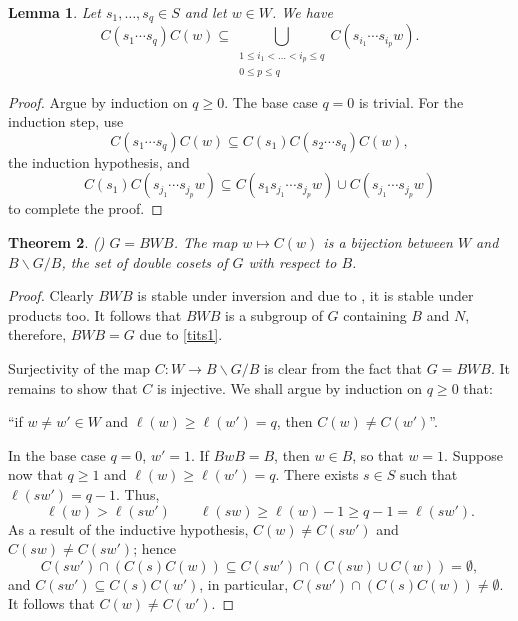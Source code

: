 \documentclass{article}
\theoremstyle{thmstyle}
\newtheorem{theorem}{Theorem}[section]
\newtheorem{lemma}[theorem]{Lemma}
\theoremstyle{defstyle}
\renewcommand{\le}{\leqslant}
\renewcommand{\ge}{\geqslant}
\begin{document}
\begin{lemma}
    Let $s_1,\dots,s_q\in S$ and let $w\in W$. We have
    \begin{equation*}
        C(s_1\cdots s_q) C(w)\subseteq\bigcup_{\substack{1\le i_1 < \dots < i_p\le q\\ 0\le p\le q}} C(s_{i_1}\cdots s_{i_p}w).
    \end{equation*}
\end{lemma}
\begin{proof}
    Argue by induction on $q\ge 0$. The base case $q = 0$ is trivial. For the induction step, use
    \begin{equation*}
        C(s_1\cdots s_q)C(w)\subseteq C(s_1)C(s_2\cdots s_q) C(w),
    \end{equation*}
    the induction hypothesis, and 
    \begin{equation*}
        C(s_1)C(s_{j_1}\cdots s_{j_p}w)\subseteq C(s_1s_{j_1}\cdots s_{j_p}w)\cup C(s_{j_1}\cdots s_{j_p}w)
    \end{equation*}
    to complete the proof.
\end{proof}

\begin{theorem}
    \big(\cite[2.3.1]{macdonald-spherical-functions}\big) $G = BWB$. The map $w\mapsto C(w)$ is a bijection between $W$ and $B\backslash G/B$, the set of double cosets of $G$ with respect to $B$.
\end{theorem}
\begin{proof}
    Clearly $BWB$ is stable under inversion and due to , it is stable under products too. It follows that $BWB$ is a subgroup of $G$ containing $B$ and $N$, therefore, $BWB = G$ due to \ref{tits1}.

    Surjectivity of the map $C: W\to B\backslash G/B$ is clear from the fact that $G = BWB$. It remains to show that $C$ is injective. We shall argue by induction on $q\ge 0$ that: 
    \begin{center}
        ``if $w\ne w'\in W$ and $\ell(w)\ge \ell(w') = q$, then $C(w)\ne C(w')$''.
    \end{center}
    In the base case $q = 0$, $w' = 1$. If $BwB = B$, then $w\in B$, so that $w = 1$. Suppose now that $q\ge 1$ and $\ell(w)\ge\ell(w') = q$. There exists $s\in S$ such that $\ell(sw') = q - 1$. Thus, 
    \begin{equation*}
        \ell(w) > \ell(sw')\qquad \ell(sw)\ge\ell(w) - 1\ge q - 1 = \ell(sw').
    \end{equation*}
    As a result of the inductive hypothesis, $C(w)\ne C(sw')$ and $C(sw)\ne C(sw')$; hence 
    \begin{equation*}
        C(sw')\cap\left(C(s)C(w)\right)\subseteq C(sw')\cap\left(C(sw)\cup C(w)\right) = \emptyset,
    \end{equation*}
    and $C(sw')\subseteq C(s)C(w')$, in particular, $C(sw')\cap \left(C(s)C(w)\right)\ne\emptyset$. It follows that $C(w)\ne C(w')$.
\end{proof}
\end{document}
